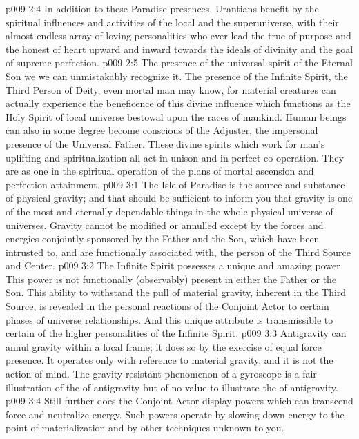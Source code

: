 \vs p009 2:4 In addition to these Paradise presences, Urantians benefit by the spiritual influences and activities of the local and the superuniverse, with their almost endless array of loving personalities who ever lead the true of purpose and the honest of heart upward and inward towards the ideals of divinity and the goal of supreme perfection.
\vs p009 2:5 The presence of the universal spirit of the Eternal Son we we can unmistakably recognize it. The presence of the Infinite Spirit, the Third Person of Deity, even mortal man may know, for material creatures can actually experience the beneficence of this divine influence which functions as the Holy Spirit of local universe bestowal upon the races of mankind. Human beings can also in some degree become conscious of the Adjuster, the impersonal presence of the Universal Father. These divine spirits which work for man’s uplifting and spiritualization all act in unison and in perfect co\hyp{}operation. They are as one in the spiritual operation of the plans of mortal ascension and perfection attainment.\plusone
{}
\vs p009 3:1 The Isle of Paradise is the source and substance of physical gravity; and that should be sufficient to inform you that gravity is one of the most  and eternally dependable things in the whole physical universe of universes. Gravity cannot be modified or annulled except by the forces and energies conjointly sponsored by the Father and the Son, which have been intrusted to, and are functionally associated with, the person of the Third Source and Center.
\pc \vs p009 3:2 The Infinite Spirit possesses a unique and amazing power This power is not functionally (observably) present in either the Father or the Son. This ability to withstand the pull of material gravity, inherent in the Third Source, is revealed in the personal reactions of the Conjoint Actor to certain phases of universe relationships. And this unique attribute is transmissible to certain of the higher personalities of the Infinite Spirit.
\pc \vs p009 3:3 Antigravity can annul gravity within a local frame; it does so by the exercise of equal force presence. It operates only with reference to material gravity, and it is not the action of mind. The gravity\hyp{}resistant phenomenon of a gyroscope is a fair illustration of the  of antigravity but of no value to illustrate the  of antigravity.
\vs p009 3:4 Still further does the Conjoint Actor display powers which can transcend force and neutralize energy. Such powers operate by slowing down energy to the point of materialization and by other techniques unknown to you.
